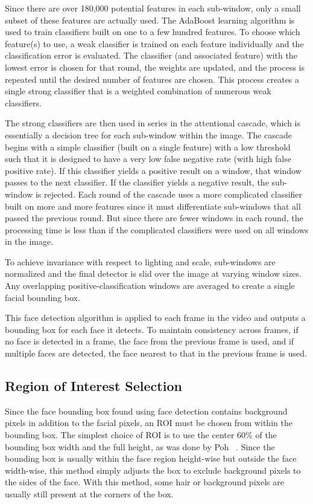 \documentclass[10pt,twocolumn,letterpaper]{article}
\begin{document}
Since there are over 180,000 potential features in each sub-window, only a small subset of these features are actually used. The AdaBoost learning algorithm is used to train classifiers built on one to a few hundred features. To choose which feature(s) to use, a weak classifier is trained on each feature individually and the classification error is evaluated. The classifier (and associated feature) with the lowest error is chosen for that round, the weights are updated, and the process is repeated until the desired number of features are chosen. This process creates a single strong classifier that is a weighted combination of numerous weak classifiers.

The strong classifiers are then used in series in the attentional cascade, which is essentially a decision tree for each sub-window within the image. The cascade begins with a simple classifier (built on a single feature) with a low threshold such that it is designed to have a very low false negative rate (with high false positive rate). If this classifier yields a positive result on a window, that window passes to the next classifier. If the classifier yields a negative result, the sub-window is rejected. Each round of the cascade uses a more complicated classifier built on more and more features since it must differentiate sub-windows that all passed the previous round. But since there are fewer windows in each round, the processing time is less than if the complicated classifiers were used on all windows in the image.

To achieve invariance with respect to lighting and scale, sub-windows are normalized and the final detector is slid over the image at varying window sizes. Any overlapping positive-classification windows are averaged to create a single facial bounding box.

This face detection algorithm is applied to each frame in the video and outputs a bounding box for each face it detects. To maintain consistency across frames, if no face is detected in a frame, the face from the previous frame is used, and if multiple faces are detected, the face nearest to that in the previous frame is used. 

\subsection{Region of Interest Selection} \label{ROI_selection}

Since the face bounding box found using face detection contains background pixels in addition to the facial pixels, an ROI must be chosen from within the bounding box. The simplest choice of ROI is to use the center 60\% of the bounding box width and the full height, as was done by Poh \etal~\cite{Poh:2010aa}. Since the bounding box is usually within the face region height-wise but outside the face width-wise, this method simply adjusts the box to exclude background pixels to the sides of the face. With this method, some hair or background pixels are usually still present at the corners of the box. 
\end{document}
